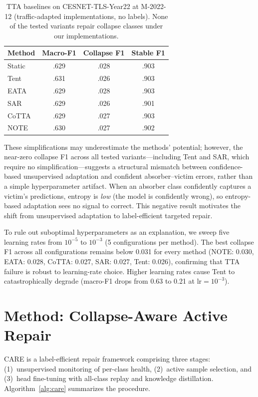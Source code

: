 \documentclass[journal]{IEEEtran}
\newcommand{\ours}{CARE}  %
\begin{document}
\begin{table}[t]
\centering
\caption{TTA baselines on CESNET-TLS-Year22 at M-2022-12 (traffic-adapted implementations, no labels). None of the tested variants repair collapse classes under our implementations.}
\label{tab:tta}
\small
\begin{tabular}{@{}l ccc@{}}
\toprule
Method & Macro-F1 & Collapse F1 & Stable F1 \\
\midrule
Static      & .629 & .028 & .903 \\
Tent        & .631 & .026 & .903 \\
EATA        & .629 & .028 & .903 \\
SAR         & .629 & .026 & .901 \\
CoTTA       & .629 & .027 & .903 \\
NOTE        & .630 & .027 & .902 \\
\bottomrule
\end{tabular}
\end{table}

These simplifications may underestimate the methods' potential; however, the near-zero collapse F1 across all tested variants---including Tent and SAR, which require no simplification---suggests a structural mismatch between confidence-based unsupervised adaptation and confident absorber--victim errors, rather than a simple hyperparameter artifact.
When an absorber class confidently captures a victim's predictions, entropy is \textit{low} (the model is confidently wrong), so entropy-based adaptation sees no signal to correct.
This negative result motivates the shift from unsupervised adaptation to label-efficient targeted repair.

To rule out suboptimal hyperparameters as an explanation, we sweep five learning rates from $10^{-5}$ to $10^{-3}$ (5 configurations per method).
The best collapse F1 across all configurations remains below 0.031 for every method (NOTE: 0.030, EATA: 0.028, CoTTA: 0.027, SAR: 0.027, Tent: 0.026), confirming that TTA failure is robust to learning-rate choice.
Higher learning rates cause Tent to catastrophically degrade (macro-F1 drops from 0.63 to 0.21 at $\text{lr}{=}10^{-3}$).

\section{Method: Collapse-Aware Active Repair}
\label{sec:method}

\ours{} is a label-efficient repair framework comprising three stages: (1)~unsupervised monitoring of per-class health, (2)~active sample selection, and (3)~head fine-tuning with all-class replay and knowledge distillation.
Algorithm~\ref{alg:care} summarizes the procedure.
\end{document}
